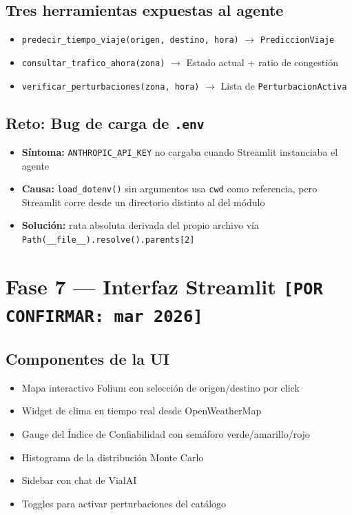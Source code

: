 \documentclass[11pt,a4paper]{article}
\begin{document}
\subsection{Tres herramientas expuestas al agente}
\begin{itemize}
  \item \texttt{predecir\_tiempo\_viaje(origen, destino, hora)} $\rightarrow$ \texttt{PrediccionViaje}
  \item \texttt{consultar\_trafico\_ahora(zona)} $\rightarrow$ Estado actual + ratio de congestión
  \item \texttt{verificar\_perturbaciones(zona, hora)} $\rightarrow$ Lista de \texttt{PerturbacionActiva}
\end{itemize}

\subsection{Reto: Bug de carga de \texttt{.env}}
\begin{itemize}
  \item \textbf{Síntoma:} \texttt{ANTHROPIC\_API\_KEY} no cargaba cuando Streamlit instanciaba el agente
  \item \textbf{Causa:} \texttt{load\_dotenv()} sin argumentos usa \texttt{cwd} como referencia, pero Streamlit corre desde un directorio distinto al del módulo
  \item \textbf{Solución:} ruta absoluta derivada del propio archivo vía \texttt{Path(\_\_file\_\_).resolve().parents[2]}
\end{itemize}

\section{Fase 7 --- Interfaz Streamlit \texttt{[POR CONFIRMAR: mar 2026]}}

\subsection{Componentes de la UI}
\begin{itemize}
  \item Mapa interactivo Folium con selección de origen/destino por click
  \item Widget de clima en tiempo real desde OpenWeatherMap
  \item Gauge del Índice de Confiabilidad con semáforo verde/amarillo/rojo
  \item Histograma de la distribución Monte Carlo
  \item Sidebar con chat de VialAI
  \item Toggles para activar perturbaciones del catálogo
\end{itemize}
\end{document}
